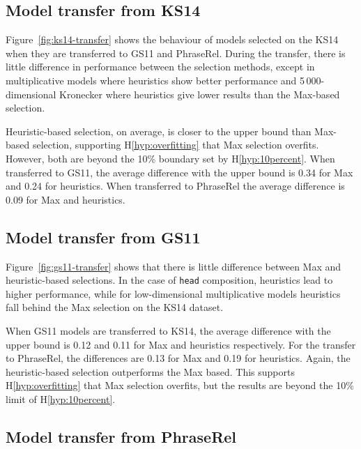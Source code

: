 \subsection{Model transfer from KS14}
\label{sec:from-ks14}

Figure~\ref{fig:ks14-transfer} shows the behaviour of models selected on the KS14 when they are transferred to GS11 and PhraseRel. During the transfer, there is little difference in performance between the selection methods, except in multiplicative models where heuristics show better performance and 5\,000-dimensional Kronecker where heuristics give lower results than the Max-based selection.

Heuristic-based selection, on average, is closer to the upper bound than Max-based selection, supporting H\ref{hyp:overfitting} that Max selection overfits. However, both are beyond the 10\% boundary set by H\ref{hyp:10percent}. When transferred to GS11, the average difference with the upper bound is 0.34 for Max and 0.24 for heuristics. When transferred to PhraseRel the average difference is 0.09 for Max and heuristics.

\subsection{Model transfer from GS11}
\label{sec:from-gs11}



Figure~\ref{fig:gs11-transfer} shows that there is little difference between Max and heuristic-based selections. In the case of \texttt{head} composition, heuristics lead to higher performance, while for low-dimensional multiplicative models heuristics fall behind the Max selection on the KS14 dataset.

When GS11 models are transferred to KS14, the average difference with the upper bound is 0.12 and 0.11 for Max and heuristics respectively. For the transfer to PhraseRel, the differences are 0.13 for Max and 0.19 for heuristics. Again, the heuristic-based selection outperforms the Max based. This supports H\ref{hyp:overfitting} that Max selection overfits, but the results are beyond the 10\% limit of H\ref{hyp:10percent}.

\subsection{Model transfer from PhraseRel}
\label{sec:from-phraserel}

